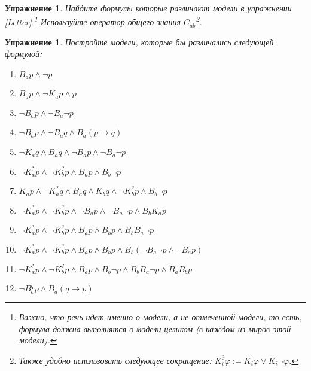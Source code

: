 \documentclass[11pt]{article}
\newtheorem{exercise}[theorem]{Упражнение}
\begin{document}
\begin{exercise} Найдите формулы которые различают модели в упражнении \ref{Letter}.\footnote{ Важно, что речь идет именно о модели, а не \textit{отмеченной} модели, то есть, формула должна выполнятся в модели целиком (в каждом из миров этой модели).} Используйте оператор общего знания $C_{ab}$\footnote{ Также удобно использовать следующее сокращение: $K^{?}_{i} \varphi:= K_i \varphi \vee K_i \neg \varphi$.}.
\end{exercise}

\begin{exercise} Постройте модели, которые бы различались следующей формулой:
\begin{enumerate}
	\item $B_a p \wedge \neg p$
	\item $B_a p \wedge \neg K_a p \wedge  p$
	\item $\neg B_a p \wedge \neg B_a \neg p$
	\item $\neg B_a p \wedge \neg B_a q \wedge B_a (p \to q)$
    \item $\neg K_a q \wedge B_a q \wedge \neg B_a p \wedge \neg B_a \neg p$
    \item $\neg K^{?}_a p \wedge \neg K^{?}_b p \wedge  B_a p \wedge B_b \neg p$
    \item $K_a p \wedge \neg K^{?}_a q \wedge B_a q \wedge K_b q \wedge \neg K^{?}_b p \wedge B_b \neg p  $
    \item $\neg K^{?}_a p \wedge \neg K^{?}_b p \wedge  \neg B_a p \wedge \neg B_a \neg p \wedge B_b K_a p$
	\item $\neg K^{?}_a p \wedge \neg K^{?}_b p \wedge B_a p \wedge B_b p  \wedge B_b B_a \neg p$ 
	\item $\neg K^{?}_a p \wedge \neg K^{?}_b p \wedge B_a p \wedge B_b p  \wedge B_b (\neg B_a \neg p \wedge \neg B_a p)$ 
	\item $\neg K^{?}_a p \wedge \neg K^{?}_b p \wedge B_a p \wedge B_b \neg p  \wedge B_b B_a \neg p \wedge B_a B_b p$ 
	\item $\neg B^{q}_{a} p \wedge  B_{a} (q \to p)$ 
\end{enumerate}	
\end{exercise}
\end{document}
